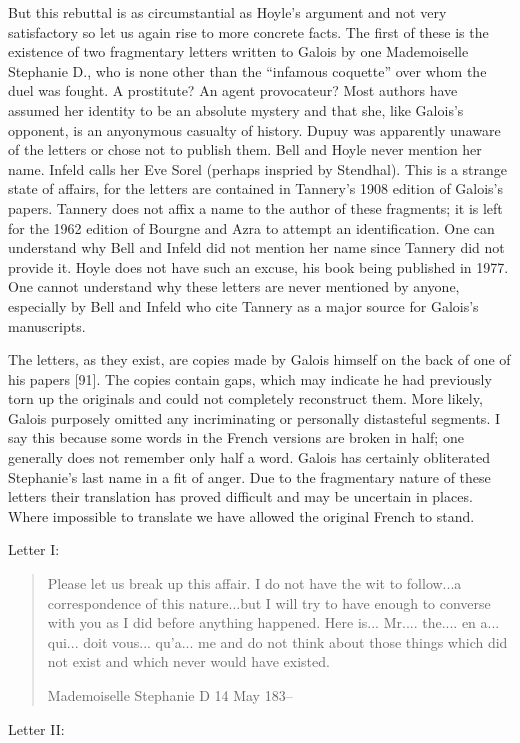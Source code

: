 \documentclass[12pt]{article}
\begin{document}
But this rebuttal is as circumstantial as Hoyle's argument and not very satisfactory so let us again rise to more concrete facts. The first of these is the existence of two fragmentary letters written to Galois by one Mademoiselle Stephanie D., who is none other than the ``infamous coquette'' over whom the duel was fought. A prostitute? An agent provocateur? Most authors have assumed her identity to be an absolute mystery and that she, like Galois's opponent, is an anyonymous casualty of history. Dupuy was apparently unaware of the letters or chose not to publish them. Bell and Hoyle never mention her name. Infeld calls her Eve Sorel (perhaps inspried by Stendhal). This is a strange state of affairs, for the letters are contained in Tannery's 1908 edition of Galois's papers. Tannery does not affix a name to the author of these fragments; it is left for the 1962 edition of Bourgne and Azra to attempt an identification. One can understand why Bell and Infeld did not mention her name since Tannery did not provide it. Hoyle does not have such an excuse, his book being published in 1977. One cannot understand why these letters are never mentioned by anyone, especially by Bell and Infeld who cite Tannery as a major source for Galois's manuscripts.

The letters, as they exist, are copies made by Galois himself on the back of one of his papers [91]. The copies contain gaps, which may indicate he had previously torn up the originals and could not completely reconstruct them. More likely, Galois purposely omitted any incriminating or personally distasteful segments. I say this because some words in the French versions are broken in half; one generally does not remember only half a word. Galois has certainly obliterated Stephanie's last name in a fit of anger. Due to the fragmentary nature of these letters their translation has proved difficult and may be uncertain in places. Where impossible to translate we have allowed the original French to stand.

\medskip\noindent
Letter I: 

\begin{quote}
Please let us break up this affair. I do not have the wit to follow...a correspondence of this nature...but I will try to have enough to converse with you as I did before anything happened. Here is... Mr.... the.... en a... qui... doit vous... qu'a... me and do not think about those things which did not exist and which never would have existed. 

\medskip
\hfill Mademoiselle Stephanie D 14 May 183--
\end{quote}
Letter II:
\end{document}
